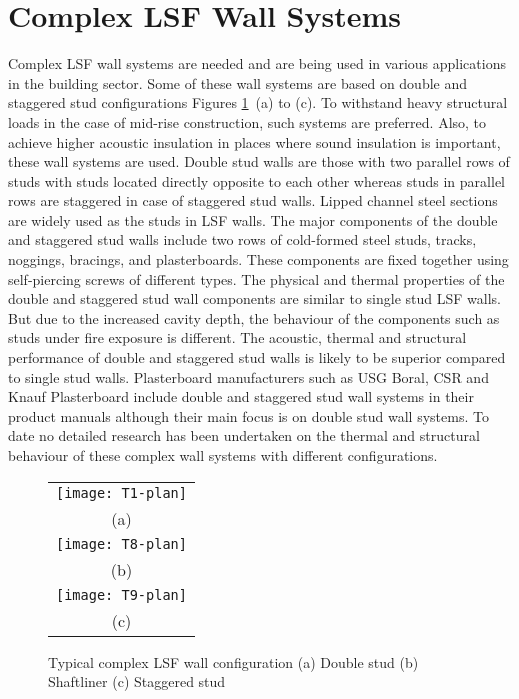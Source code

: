 \section{Complex LSF Wall Systems}
Complex LSF wall systems are needed and are being used in various applications in the building sector. Some of these wall systems are based on double and staggered stud configurations Figures \ref{fig:typical-complex}~(a) to (c). To withstand heavy structural loads in the case of mid-rise construction, such systems are preferred. Also, to achieve higher acoustic insulation in places where sound insulation is important, these wall systems are used. Double stud walls are those with two parallel rows of studs with studs located directly opposite to each other whereas studs in parallel rows are staggered in case of staggered stud walls. Lipped channel steel sections are widely used as the studs in LSF walls. The major components of the double and staggered stud walls include two rows of cold-formed steel studs, tracks, noggings, bracings, and plasterboards. These components are fixed together using self-piercing screws of different types. The physical and thermal properties of the double and staggered stud wall components are similar to single stud LSF walls. But due to the increased cavity depth, the behaviour of the components such as studs under fire exposure is different. The acoustic, thermal and structural performance of double and staggered stud walls is likely to be superior compared to single stud walls. Plasterboard manufacturers such as USG Boral, CSR and Knauf Plasterboard include double and staggered stud wall systems in their product manuals although their main focus is on double stud wall systems. To date no detailed research has been undertaken on the thermal and structural behaviour of these complex wall systems with different configurations. 
\begin{figure}[!htbp]
	\centering
		\begin{tabular}{c}
			\texttt{[image: T1-plan]} \\
			(a) \\
			\texttt{[image: T8-plan]} \\ 
			(b)  \\ 
			\texttt{[image: T9-plan]} \\ 
			(c)  \\ 
		\end{tabular} 
		\caption{Typical complex LSF wall configuration (a) Double stud (b) Shaftliner (c) Staggered stud }
		\label{fig:typical-complex}
\end{figure}

